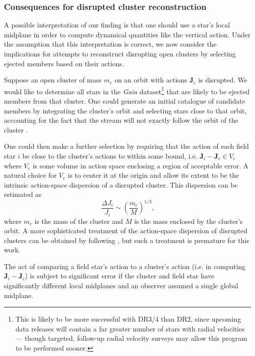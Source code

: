 \documentclass[twocolumn]{aastex62}
\newcommand{\beq}{\begin{equation}}
\newcommand{\eeq}{\end{equation}}
\begin{document}
\subsubsection{Consequences for disrupted cluster reconstruction}
\label{sssec:reconstruction}

A possible interpretation of our finding is that one should use a star's local
midplane in order to compute dynamical quantities like the vertical action.
Under the assumption that this interpretation is correct, we now consider the
implications for attempts to reconstruct disrupting open clusters by selecting
ejected members based on their actions.

Suppose an open cluster of mass $m_c$ on an orbit with actions $\bm{J}_c$ is
disrupted. We would like to determine all stars in the {\em Gaia}
dataset\footnote{This is likely to be more successful with DR3/4 than DR2,
since upcoming data releases will contain a far greater number of stars with
radial velocities --- though targeted, follow-up radial velocity surveys may
allow this program to be performed sooner.} that are likely to be ejected
members from that cluster. One could generate an initial catalogue of
candidate members by integrating the cluster's orbit and selecting stars close
to that orbit, accounting for the fact that the stream will not exactly follow
the orbit of the cluster \citep[e.g.][]{2011MNRAS.413.1852E}.

One could then make a further selection by requiring that the action of each
field star $i$ be close to the cluster's actions to within some bound, i.e.
$\bm{J}_i - \bm{J}_c \in V_e$ where $V_e$ is some volume in action space
enclosing a region of acceptable error. A natural choice for $V_e$ is to
center it at the origin and allow its extent to be the intrinsic action-space
dispersion of a disrupted cluster. This dispersion can be estimated as
\citep[Section~8.3.3][]{2008gady.book.....B}
\beq \label{eq:action_disp}
\frac{\Delta J_i}{J_i} \sim \left(\frac{m_c}{M}\right)^{1/3}\text{,}
\eeq
where $m_c$ is the mass of the cluster and $M$ is the mass enclosed by the
cluster's orbit. A more sophisticated treatment of the action-space dispersion
of disrupted clusters can be obtained by following
\citet{2011MNRAS.413.1852E}, but such a treatment is premature for this work.

The act of comparing a field star's action to a cluster's action (i.e. in
computing $\bm{J}_i - \bm{J}_c$) is subject to significant error if the
cluster and field star have significantly different local midplanes and an
observer assumed a single global midplane.
\end{document}
